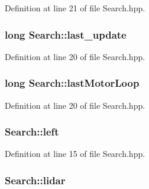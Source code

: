Definition at line 21 of file Search.\-hpp.

\hypertarget{classSearch_ac5a0e7842cdfec65c8af8fd2dd0d4dcc}{
\subsubsection[{last\-\_\-update}]{\setlength{\rightskip}{0pt plus 5cm}long Search\-::last\-\_\-update\hspace{0.3cm}{\ttfamily [private]}}}\label{classSearch_ac5a0e7842cdfec65c8af8fd2dd0d4dcc}


Definition at line 20 of file Search.\-hpp.

\hypertarget{classSearch_af73bd725381f47afa3bf6af64d39f3b6}{
\subsubsection[{last\-Motor\-Loop}]{\setlength{\rightskip}{0pt plus 5cm}long Search\-::last\-Motor\-Loop\hspace{0.3cm}{\ttfamily [private]}}}\label{classSearch_af73bd725381f47afa3bf6af64d39f3b6}


Definition at line 20 of file Search.\-hpp.

\hypertarget{classSearch_ad1df1ee1c5afbeb2767a4c1e064e7318}{
\subsubsection[{left}]{ Search\-::left\hspace{0.3cm}{\ttfamily [private]}}}\label{classSearch_ad1df1ee1c5afbeb2767a4c1e064e7318}


Definition at line 15 of file Search.\-hpp.

\hypertarget{classSearch_ad1209571d5e6cb4c53494549d8ec4ac6}{
\subsubsection[{lidar}]{ Search\-::lidar\hspace{0.3cm}{\ttfamily [private]}}}\label{classSearch_ad1209571d5e6cb4c53494549d8ec4ac6}


